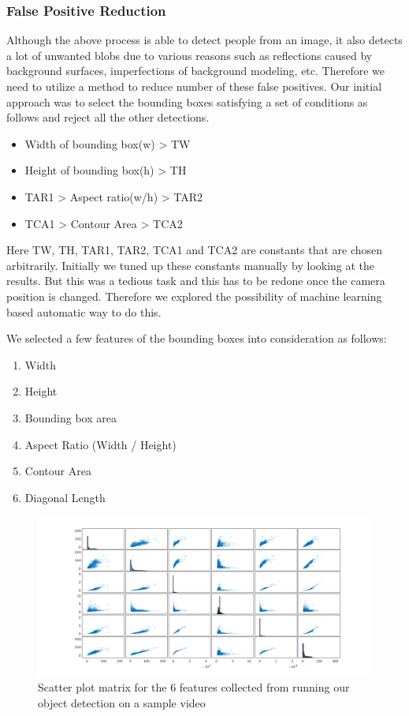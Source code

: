 \documentclass[12pt,a4paper]{report}
\begin{document}
\subsubsection{False Positive Reduction}
Although the above process is able to detect people from an image, it also detects a lot of unwanted blobs due to various reasons such as reflections caused by background surfaces, imperfections of background modeling, etc. Therefore we need to utilize a method to reduce number of these false positives. Our initial approach was to select the bounding boxes satisfying a set of conditions as follows and reject all the other detections.
\begin{itemize}
\item Width of bounding box(w) > TW
\item Height of bounding box(h) > TH
\item TAR1 > Aspect ratio(w/h) > TAR2
\item TCA1 > Contour Area > TCA2
\end{itemize}
Here TW, TH, TAR1, TAR2, TCA1 and TCA2 are constants that are chosen arbitrarily. Initially we tuned up these constants manually by looking at the results. But this was a tedious task and this has to be redone once the camera position is changed. Therefore we explored the possibility of machine learning based automatic way to do this.

\noindent We selected a few features of the bounding boxes into consideration as follows:
\begin{enumerate}
\item Width
\item Height
\item Bounding box area
\item Aspect Ratio (Width / Height)
\item Contour Area
\item Diagonal Length
\end{enumerate}

\begin{figure}[H]
\includegraphics[width=\textwidth]{pca/scatter_plots_pca.png}
\centering
\caption{Scatter plot matrix for the 6 features collected from running our object detection on a sample video}
\label{pca1}
\end{figure}
\end{document}
